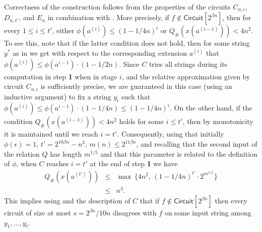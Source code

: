 \documentclass{toc}
\begin{document}
Correctness of the construction follows from the properties of the circuits $C_{n,i}$, $D_{n,t'}$, and $E_n$ in combination with . More precisely, if $f \notin \mathsf{Circuit}[2^{\beta n}]$, then for every $1 \leq i \leq t'$, either $\phi(a^{(i)}) \leq (1 - 1/4n)^i$ or $Q_{\#}(x(a^{(i-1)})) < 4n^2$. To see this, note that if the latter condition does not hold, then for some string $y^*$ as in  we get with respect to the corresponding extension $a^{(i)}$ that $\phi(a^{(i)}) \leq \phi(a^{i-1}) \cdot (1 - 1/2n)$. Since $C$ tries all strings during its computation in step \textbf{1} when in stage $i$, and the relative approximation given by circuit $C_{n,i}$ is sufficiently precise, we are guaranteed in this case (using an inductive argument) to fix a string $y_i$ such that $\phi(a^{(i)}) \leq \phi(a^{i-1}) \cdot (1 - 1/4n) \leq (1 - 1/4n)^i$. On the other hand, if the condition $Q_{\#}(x(a^{(i-1)})) < 4n^2$ holds for some $i \leq t'$, then by monotonicity it is maintained until we reach $i = t'$. Consequently, using that initially $\phi(\epsilon) = 1$, $t' = 2^{10 \beta n} - n^3$, $m(n) \leq 2^{11 \beta n}$, and recalling that the second input of the relation $Q$ has length $m^{1/5}$ and that this parameter is related to the definition of $\phi$, when $C$ reaches $i = t'$ at the end of step \textbf{1} we have
\begin{eqnarray}
Q_{\#}(x(a^{(t')})) & \leq & \max \,\{4n^2, \,(1 - 1/4n)^{t'} \cdot 2^{m^{1/5}}\} \nonumber \\
& \leq & n^3. \nonumber 
\end{eqnarray}
This implies using   and the description of $C$ that if $f \notin \mathsf{Circuit}[2^{\beta n}]$ then every circuit of size at most $s = 2^{\beta n}/10n$ disagrees with $f$ on some input string among $y_1, \ldots, y_t$.
\end{document}
